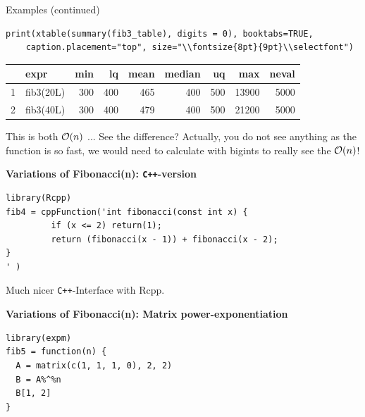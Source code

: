 \documentclass[11pt,compress,t,notes=noshow, xcolor=table]{beamer}
\begin{document}
\begin{vbframe}{Examples (continued)}
\begin{scriptsize}
\begin{verbatim}
print(xtable(summary(fib3_table), digits = 0), booktabs=TRUE, 
    caption.placement="top", size="\\fontsize{8pt}{9pt}\\selectfont")
\end{verbatim}

\begin{table}[ht]
  \centering
  \begingroup\fontsize{8pt}{9pt}\selectfont
  \begin{tabular}{rlrrrrrrr}
    \toprule
   & expr & min & lq & mean & median & uq & max & neval \\ 
    \midrule
  1 & fib3(20L) & 300 & 400 & 465 & 400 & 500 & 13900 & 5000 \\ 
    2 & fib3(40L) & 300 & 400 & 479 & 400 & 500 & 21200 & 5000 \\ 
     \bottomrule
  \end{tabular}
  \endgroup
  \end{table}
\end{scriptsize}

This is both $\mathcal{O}(n)$ ... See the difference? Actually, you do not see anything as the function
is so fast, we would need to calculate with bigints to really see the $\mathcal{O}(n)$!

\framebreak

\textbf{Variations of Fibonacci(n): \texttt{C++}-version}
\begin{verbatim}
library(Rcpp)
fib4 = cppFunction('int fibonacci(const int x) {
         if (x <= 2) return(1);
         return (fibonacci(x - 1)) + fibonacci(x - 2);
}
' )
\end{verbatim}

Much nicer \texttt{C++}-Interface with Rcpp.

\framebreak




\textbf{Variations of Fibonacci(n): Matrix power-exponentiation}

\begin{footnotesize}
\begin{verbatim}
library(expm)
fib5 = function(n) {
  A = matrix(c(1, 1, 1, 0), 2, 2)
  B = A%^%n
  B[1, 2]
}
\end{verbatim}
\end{footnotesize}


\end{vbframe}
\end{document}
